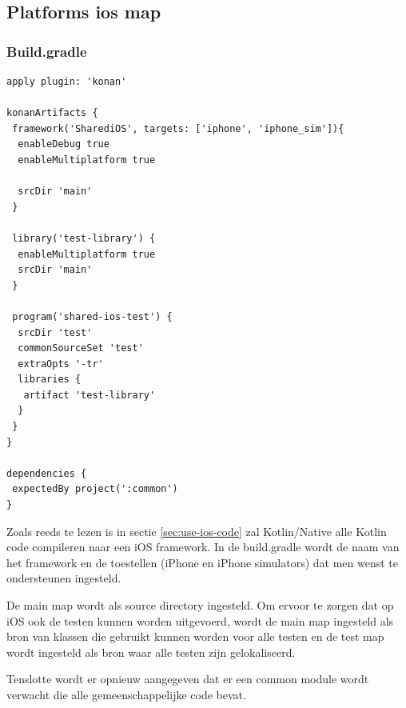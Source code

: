 \subsection{Platforms ios map}
\subsubsection{Build.gradle}
\label{sec:ios-build-gradle}
\begin{lstlisting}
apply plugin: 'konan'

konanArtifacts {
 framework('SharediOS', targets: ['iphone', 'iphone_sim']){
  enableDebug true
  enableMultiplatform true

  srcDir 'main'
 }

 library('test-library') {
  enableMultiplatform true
  srcDir 'main'
 }

 program('shared-ios-test') {
  srcDir 'test'
  commonSourceSet 'test'
  extraOpts '-tr'
  libraries {
   artifact 'test-library'
  }
 }
}

dependencies {
 expectedBy project(':common')
}
\end{lstlisting}

Zoals reeds te lezen is in sectie \ref{sec:use-ios-code} zal Kotlin/Native alle Kotlin code compileren naar een iOS framework. In de build.gradle wordt de naam van het framework en de toestellen (iPhone en iPhone simulators) dat men wenst te ondersteunen ingesteld.

De main map wordt als source directory ingesteld. Om ervoor te zorgen dat op iOS ook de testen kunnen worden uitgevoerd, wordt de main map ingesteld als bron van klassen die gebruikt kunnen worden voor alle testen en de test map wordt ingesteld als bron waar alle testen zijn gelokaliseerd.

Tenslotte wordt er opnieuw aangegeven dat er een common module wordt verwacht die alle gemeenschappelijke code bevat.

